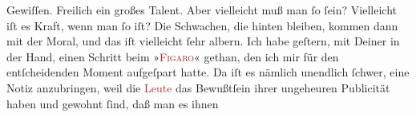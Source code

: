                Gewiſſen. Freilich ein großes Talent. Aber vielleicht muß man ſo ſein? Vielleicht iſt
               es Kraft, wenn man ſo iſt? Die Schwachen, die hinten bleiben, kommen dann mit der
               Moral, und das iſt vielleicht ſehr albern.\pend
           \pstart
           Ich habe geſtern, mit Deiner \label{K_L02767-77v}\label{K_L02767-77h} in der Hand, einen
               Schritt beim »\textsc{\textcolor{brown}{Figaro}{}\ledrightnote{\textcolor{brown}{Le Figaro}}}« gethan, den ich mir für \strikeout{\textcolor{gray}{einen}} den entſcheidenden Moment {\pb}aufgeſpart hatte.
               Da iſt es nämlich unendlich ſchwer,  eine Notiz
               anzubringen, weil die \textcolor{brown}{Leute}{} das
               Bewußtſein ihrer ungeheuren Publicität haben und gewohnt ſind, daß man es ihnen
